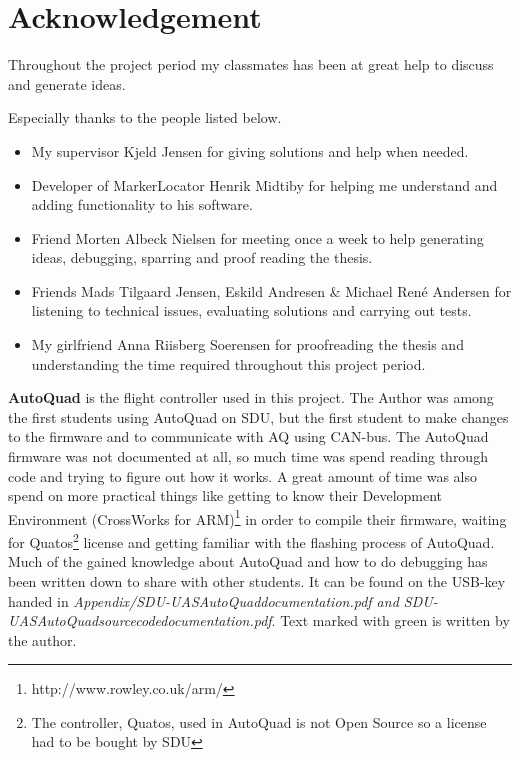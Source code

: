 \section*{Acknowledgement}
Throughout the project period my classmates has been at great help to discuss and generate ideas.

Especially thanks to the people listed below.
\begin{itemize}
	\item My supervisor Kjeld Jensen for giving solutions and help when needed.
	\item Developer of MarkerLocator Henrik Midtiby for helping me understand and adding functionality to his software.
	\item Friend Morten Albeck Nielsen for meeting once a week to help generating ideas, debugging, sparring and proof reading the thesis.
	\item Friends Mads Tilgaard Jensen, Eskild Andresen \& Michael René Andersen for listening to technical issues, evaluating solutions and carrying out tests.
	\item My girlfriend Anna Riisberg Soerensen for proofreading the thesis and understanding the time required throughout this project period.
\end{itemize}


\textbf{AutoQuad} is the flight controller used in this project. The Author was among the first students using AutoQuad on SDU, but the first student to make changes to the firmware and to communicate with AQ using CAN-bus. The AutoQuad firmware was not documented at all, so much time was spend reading through code and trying to figure out how it works. A great amount of time was also spend on more practical things like getting to know their Development Environment (CrossWorks for ARM)\footnote{http://www.rowley.co.uk/arm/} in order to compile their firmware, waiting for Quatos\footnote{The controller, Quatos,  used in AutoQuad is not Open Source so a license had to be bought by SDU} license and getting familiar with the flashing process of AutoQuad.\\
Much of the gained knowledge about AutoQuad and how to do debugging has been written down to share with other students. It can be found on the USB-key handed in \textit{Appendix/SDU-UASAutoQuaddocumentation.pdf and SDU-UASAutoQuadsourcecodedocumentation.pdf}. Text marked with green is written by the author.